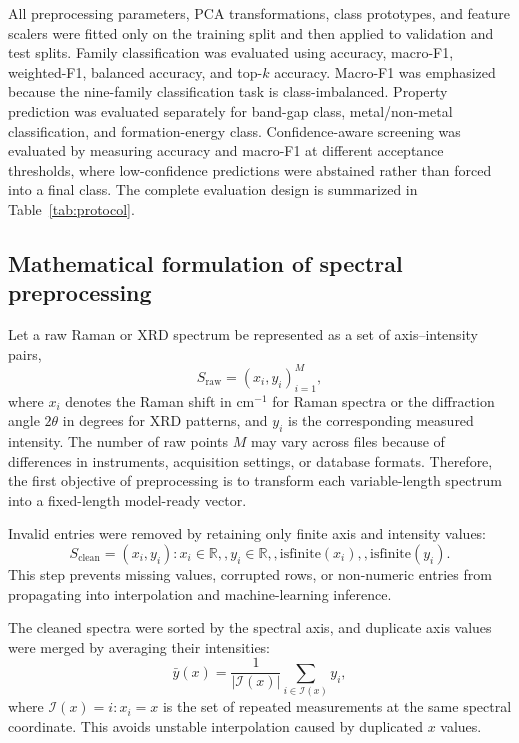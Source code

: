 All preprocessing parameters, PCA transformations, class prototypes, and feature scalers were fitted only on the training split and then applied to validation and test splits. Family classification was evaluated using accuracy, macro-F1, weighted-F1, balanced accuracy, and top-$k$ accuracy. Macro-F1 was emphasized because the nine-family classification task is class-imbalanced. Property prediction was evaluated separately for band-gap class, metal/non-metal classification, and formation-energy class. Confidence-aware screening was evaluated by measuring accuracy and macro-F1 at different acceptance thresholds, where low-confidence predictions were abstained rather than forced into a final class. The complete evaluation design is summarized in Table~\ref{tab:protocol}.
\subsection{Mathematical formulation of spectral preprocessing}
\label{subsec:preprocessing_formulas}

Let a raw Raman or XRD spectrum be represented as a set of axis--intensity pairs,
\begin{equation}
S_{\mathrm{raw}}={(x_i,y_i)}_{i=1}^{M},
\end{equation}
where $x_i$ denotes the Raman shift in cm$^{-1}$ for Raman spectra or the diffraction angle $2\theta$ in degrees for XRD patterns, and $y_i$ is the corresponding measured intensity. The number of raw points $M$ may vary across files because of differences in instruments, acquisition settings, or database formats. Therefore, the first objective of preprocessing is to transform each variable-length spectrum into a fixed-length model-ready vector.

Invalid entries were removed by retaining only finite axis and intensity values:
\begin{equation}
S_{\mathrm{clean}}={(x_i,y_i): x_i \in \mathbb{R},, y_i \in \mathbb{R},, \mathrm{isfinite}(x_i),, \mathrm{isfinite}(y_i)}.
\end{equation}
This step prevents missing values, corrupted rows, or non-numeric entries from propagating into interpolation and machine-learning inference.

The cleaned spectra were sorted by the spectral axis, and duplicate axis values were merged by averaging their intensities:
\begin{equation}
\bar{y}(x)=\frac{1}{|\mathcal{I}(x)|}\sum_{i\in \mathcal{I}(x)}y_i,
\end{equation}
where $\mathcal{I}(x)={i:x_i=x}$ is the set of repeated measurements at the same spectral coordinate. This avoids unstable interpolation caused by duplicated $x$ values.

